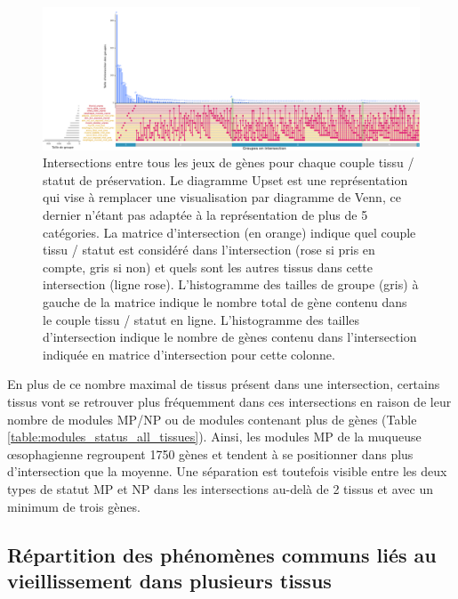 \begin{landscape}
\begin{figure}[p]
  \centering
  \includegraphics[width=1.5\textheight]{img/chap2/chap2_upset_genes_unpres_modpres_by_tissue.pdf}
  \caption{Intersections entre tous les jeux de gènes pour chaque couple tissu / statut de préservation. Le diagramme Upset est une représentation qui vise à remplacer une visualisation par diagramme de Venn, ce dernier n'étant pas adaptée à la représentation de plus de 5 catégories. La matrice d'intersection (en orange) indique quel couple tissu / statut est considéré dans l'intersection (rose si pris en compte, gris si non) et quels sont les autres tissus dans cette intersection (ligne rose). L'histogramme des tailles de groupe (gris) à gauche de la matrice indique le nombre total de gène contenu dans le couple tissu / statut en ligne. L'histogramme des tailles d'intersection indique le nombre de gènes contenu dans l'intersection indiquée en matrice d'intersection pour cette colonne.}
  \label{figure:upset_intersection_genes_tissu_unpres_modpres}
\end{figure}
\end{landscape}

En plus de ce nombre maximal de tissus présent dans une intersection, certains tissus vont se retrouver plus fréquemment dans ces intersections en raison de leur nombre de modules MP/NP ou de modules contenant plus de gènes (Table \ref{table:modules_status_all_tissues}). Ainsi, les modules MP de la muqueuse œsophagienne regroupent 1750 gènes et tendent à se positionner dans plus d'intersection que la moyenne. Une séparation est toutefois visible entre les deux types de statut MP et NP dans les intersections au-delà de 2 tissus et avec un minimum de trois gènes.


\subsection{Répartition des phénomènes communs liés au vieillissement dans plusieurs tissus}

